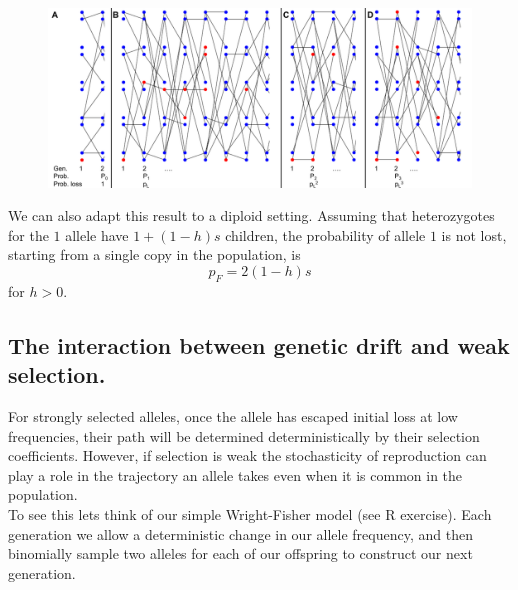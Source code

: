 \begin{figure}
\begin{center}
\includegraphics[width=\textwidth]{figures/Proof_of_pL_2s}
\end{center}
\caption{} \label{fig:Proof_of_pL_2s}
\end{figure}

We can also adapt this result to a diploid setting.
Assuming that heterozygotes for the $1$ allele have $1+(1-h)s$ children, the
probability of allele $1$ is not lost, starting from a single copy in
the population, is
\begin{equation}
p_F = 2 (1-h)s \label{eqn:diploid_escape}
\end{equation}
for $h>0$.\\


\subsection{The interaction between genetic drift and weak selection.}
For strongly selected alleles, once the allele has escaped initial
loss at low frequencies, their path will be determined deterministically by their
selection coefficients. However, if selection is weak the
stochasticity of reproduction can play a role in the trajectory an
allele takes even when it is common in the population.\\

To see this lets think of our simple Wright-Fisher model (see R
exercise). Each generation we allow a deterministic change in our
allele frequency, and then binomially sample two alleles for each of
our offspring to construct our next generation.\\



